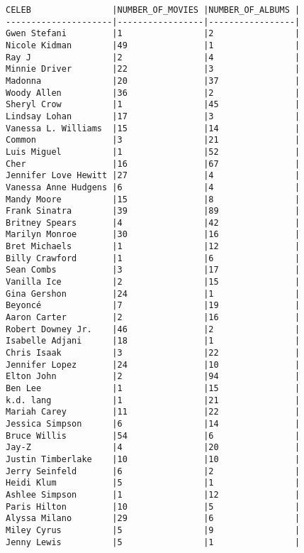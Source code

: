 \documentclass{article}
\begin{document}
        \begin{verbatim}
CELEB                |NUMBER_OF_MOVIES |NUMBER_OF_ALBUMS |
---------------------|-----------------|-----------------|
Gwen Stefani         |1                |2                |
Nicole Kidman        |49               |1                |
Ray J                |2                |4                |
Minnie Driver        |22               |3                |
Madonna              |20               |37               |
Woody Allen          |36               |2                |
Sheryl Crow          |1                |45               |
Lindsay Lohan        |17               |3                |
Vanessa L. Williams  |15               |14               |
Common               |3                |21               |
Luis Miguel          |1                |52               |
Cher                 |16               |67               |
Jennifer Love Hewitt |27               |4                |
Vanessa Anne Hudgens |6                |4                |
Mandy Moore          |15               |8                |
Frank Sinatra        |39               |89               |
Britney Spears       |4                |42               |
Marilyn Monroe       |30               |16               |
Bret Michaels        |1                |12               |
Billy Crawford       |1                |6                |
Sean Combs           |3                |17               |
Vanilla Ice          |2                |15               |
Gina Gershon         |24               |1                |
Beyoncé              |7                |19               |
Aaron Carter         |2                |16               |
Robert Downey Jr.    |46               |2                |
Isabelle Adjani      |18               |1                |
Chris Isaak          |3                |22               |
Jennifer Lopez       |24               |10               |
Elton John           |2                |94               |
Ben Lee              |1                |15               |
k.d. lang            |1                |21               |
Mariah Carey         |11               |22               |
Jessica Simpson      |6                |14               |
Bruce Willis         |54               |6                |
Jay-Z                |4                |20               |
Justin Timberlake    |10               |10               |
Jerry Seinfeld       |6                |2                |
Heidi Klum           |5                |1                |
Ashlee Simpson       |1                |12               |
Paris Hilton         |10               |5                |
Alyssa Milano        |29               |6                |
Miley Cyrus          |5                |9                |
Jenny Lewis          |5                |1                |
        \end{verbatim}
        
\end{document}
